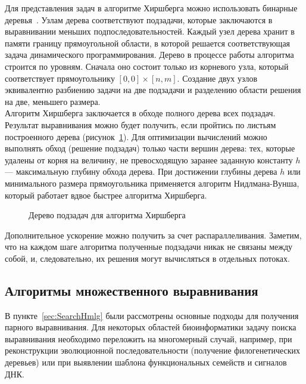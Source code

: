 \indent Для представления задач в алгоритме Хиршберга можно использовать бинарные деревья~\cite{HirshbergParallel}. Узлам дерева соответствуют подзадачи, которые заключаются в выравнивании меньших подпоследовательностей. Каждый узел дерева хранит в памяти границу прямоугольной области, в которой решается соответствующая задача динамического программирования. Дерево в процессе работы алгоритма строится по уровням. Сначала оно состоит только из корневого узла, который соответствует прямоугольнику $[0,0]\times[n,m]$. Создание двух узлов эквивалентно разбиению задачи на две подзадачи и разделению области решения на две, меньшего размера.\\
\indent Алгоритм Хиршберга заключается в обходе полного дерева всех подзадач. Результат выравнивания можно будет получить, если пройтись по листьям построенного дерева (рисунок~\ref{ris:HirshbergExample}). Для оптимизации вычислений можно выполнять обход (решение подзадач) только части вершин дерева: тех, которые удалены от корня на величину, не превосходящую заранее заданную константу $h$ --- максимальную глубину обхода дерева. При достижении глубины дерева $h$ или минимального размера прямоугольника применяется алгоритм Нидлмана-Вунша, который работает вдвое быстрее алгоритма Хиршберга.

\begin{figure}[h]
	\caption{Дерево подзадач для алгоритма Хиршберга}
	\label{ris:HirshbergExample}
\end{figure}

\indent Дополнительное ускорение можно получить за счет распараллеливания. Заметим, что на каждом шаге алгоритма полученные подзадачи никак не связаны между собой, и, следовательно, их решения могут вычисляться в отдельных потоках.

\subsection[Алгоритмы множественного выравнивания]{\large Алгоритмы множественного выравнивания} \label{sec:Multy}
\hspace{\parindent} В пункте~\ref{sec:SearchHmlg} были рассмотрены основные подходы для получения парного выравнивания. Для некоторых областей биоинформатики задачу поиска выравнивания необходимо переложить на многомерный случай, например, при реконструкции эволюционной последовательности (получение филогенетических деревьев) или при выявлении шаблона функциональных семейств и сигналов ДНК.

